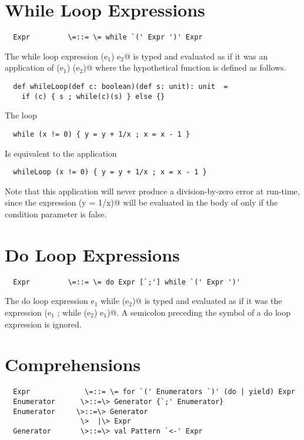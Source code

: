 \documentclass[11pt]{report}
\begin{document}
\section{While Loop Expressions}

\syntax\begin{verbatim}
  Expr	       \=::= \= while `(' Expr ')' Expr
\end{verbatim}

The while loop expression \verb@while (e$_1$) e$_2$@ is typed and
evaluated as if it was an application of \verb@whileLoop (e$_1$) (e$_2$)@ where
the hypothetical function \verb@whileLoop@ is defined as follows.

\begin{verbatim}
  def whileLoop(def c: boolean)(def s: unit): unit  =
    if (c) { s ; while(c)(s) } else {}
\end{verbatim}

\example The loop 
\begin{verbatim}
  while (x != 0) { y = y + 1/x ; x = x - 1 }
\end{verbatim}
Is equivalent to the application
\begin{verbatim}
  whileLoop (x != 0) { y = y + 1/x ; x = x - 1 }
\end{verbatim}
Note that this application will never produce a division-by-zero 
error at run-time, since the
expression \verb@(y = 1/x)@ will be evaluated in the body of
\verb@while@ only if the condition parameter is false.

\section{Do Loop Expressions}

\syntax\begin{verbatim}
  Expr	       \=::= \= do Expr [`;'] while `(' Expr ')'
\end{verbatim}

The do loop expression \verb@do e$_1$ while (e$_2$)@ is typed and
evaluated as if it was the expression \verb@(e$_1$ ; while (e$_2$) e$_1$)@.
A semicolon preceding the \verb@while@ symbol of a do loop expression is ignored.

\section{Comprehensions}

\syntax\begin{verbatim}
  Expr	           \=::= \= for `(' Enumerators `)' (do | yield) Expr
  Enumerator      \>::=\> Generator {`;' Enumerator}
  Enumerator     \>::=\> Generator
                  \>  |\> Expr
  Generator       \>::=\> val Pattern `<-' Expr
\end{verbatim}
\end{document}
